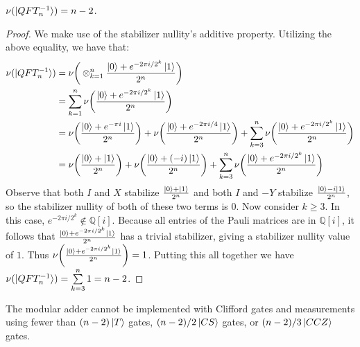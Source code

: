 \documentclass[12pt]{dalthesis}
\begin{document}
\begin{lemma}
\label{NullityQFT}
$\nu (\ket{QFT_n^{-1}}) = n-2$.
\end{lemma}
\begin{proof}
We make use of the stabilizer nullity's additive property. Utilizing the above equality, we have that:
\begin{align*}
\nu (\ket{QFT_n^{-1}}) & = \nu \bigg( \otimes_{k=1}^n \frac{\ket{0} + e^{-2\pi i /2^k} \ket{1}}{2^n}\bigg) \\
& = \sum\limits_{k=1}^n \nu \bigg(\frac{\ket{0} + e^{-2\pi i /2^k} \ket{1}}{2^n}\bigg) \\
& = \nu \bigg(\frac{\ket{0} + e^{-\pi i} \ket{1}}{2^n}\bigg) + \nu \bigg(\frac{\ket{0} + e^{-2\pi i /4} \ket{1}}{2^n}\bigg) + \sum\limits_{k=3}^n \nu \bigg(\frac{\ket{0} + e^{-2\pi i /2^k} \ket{1}}{2^n}\bigg) \\
& = \nu \bigg(\frac{\ket{0} + \ket{1}}{2^n}\bigg) + \nu \bigg(\frac{\ket{0} + (-i)\ket{1}}{2^n}\bigg) + \sum\limits_{k=3}^n \nu \bigg(\frac{\ket{0} + e^{-2\pi i /2^k} \ket{1}}{2^n}\bigg)
\end{align*}
Observe that both $I$ and $X$ stabilize $\frac{\ket{0} + \ket{1}}{2^n}$ and both $I$ and $-Y$ stabilize $\frac{\ket{0} - i\ket{1}}{2^n}$, so the stabilizer nullity of both of these two terms is $0$. Now consider $k \geq 3$. In this case, $e^{-2\pi i /2^k} \not\in \mathbb{Q}[i]$. Because all entries of the Pauli matrices are in $\mathbb{Q}[i]$, it follows that $\frac{\ket{0} + e^{-2\pi i /2^k} \ket{1}}{2^n}$ has a trivial stabilizer, giving a stabilizer nullity value of $1$. Thus $\nu \bigg(\frac{\ket{0} + e^{-2\pi i /2^k} \ket{1}}{2^n}\bigg) = 1$. Putting this all together we have $\nu (\ket{QFT_n^{-1}}) = \sum\limits_{k=3}^n 1 = n-2$.
\end{proof}


\begin{proposition}
\label{AdderNu}
The modular adder cannot be implemented with Clifford gates and
measurements using fewer than $(n-2) \ket{T}$ gates, $(n-2)/2 \ket{CS}$
gates, or $(n-2)/3 \ket{CCZ}$ gates.
\end{proposition}
\end{document}
